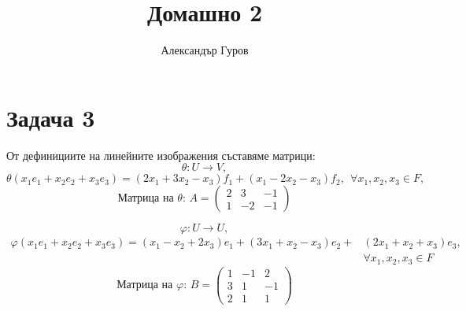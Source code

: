 \documentclass{article}
\title{Домашно 2}
\author{Александър Гуров}
\date{\datebulgarian{\today}}
\begin{document}
\maketitle
\section*{Задача 3}

От дефинициите на линейните изображения съставяме матрици:
\[
    \theta : U \longrightarrow V,
\]
\[
    \theta ( x_1 e_1 + x_2 e_2 + x_3 e_3) = ( 2 x_1 + 3 x_2 - x_3) f_1 + ( x_1 - 2 x_2 - x_3) f_2, \ \ \forall x_1, x_2, x_3 \in F,
\]
\[
    \text{Матрица на $\theta$: }
    A=
    \left(\begin{array}{ccc}
            2 & 3  & -1 \\
            1 & -2 & -1
        \end{array}
    \right)
\]

\[
    \varphi : U \longrightarrow U,
\]
\begin{align*}
    \varphi ( x_1 e_1 + x_2 e_2 + x_3 e_3) = ( x _1 - x_2 + 2 x_3) e_1 + ( 3 x_1 + x_2 - x_3) e_2 + & ( 2 x_1 + x_2 + x_3) e_3,   \\
                                                                                                    & \forall x_1, x_2, x_3 \in F
\end{align*}
\[
    \text{Матрица на $\varphi$: }
    B=
    \left(\begin{array}{ccc}
            1 & -1 & 2  \\
            3 & 1  & -1 \\
            2 & 1  & 1
        \end{array}
    \right)
\]
\end{document}
